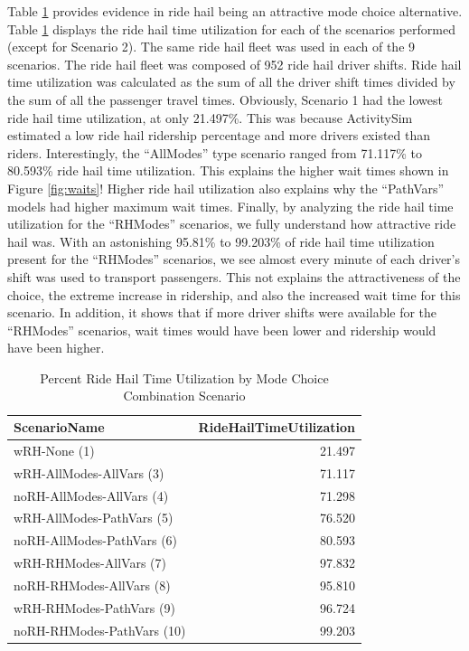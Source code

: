 \documentclass[12pt, oneside, openright]{byuthesis}
\begin{document}
Table \ref{tab:timeutil} provides evidence in ride hail being an attractive mode choice alternative. Table \ref{tab:timeutil} displays the ride hail time utilization for each of the scenarios performed (except for Scenario 2). The same ride hail fleet was used in each of the 9 scenarios. The ride hail fleet was composed of 952 ride hail driver shifts. Ride hail time utilization was calculated as the sum of all the driver shift times divided by the sum of all the passenger travel times. Obviously, Scenario 1 had the lowest ride hail time utilization, at only 21.497\%. This was because ActivitySim estimated a low ride hail ridership percentage and more drivers existed than riders. Interestingly, the ``AllModes'' type scenario ranged from 71.117\% to 80.593\% ride hail time utilization. This explains the higher wait times shown in Figure \ref{fig:waits}! Higher ride hail utilization also explains why the ``PathVars'' models had higher maximum wait times. Finally, by analyzing the ride hail time utilization for the ``RHModes'' scenarios, we fully understand how attractive ride hail was. With an astonishing 95.81\% to 99.203\% of ride hail time utilization present for the ``RHModes'' scenarios, we see almost every minute of each driver's shift was used to transport passengers. This not explains the attractiveness of the choice, the extreme increase in ridership, and also the increased wait time for this scenario. In addition, it shows that if more driver shifts were available for the ``RHModes'' scenarios, wait times would have been lower and ridership would have been higher.

\begin{table}

\caption{\label{tab:timeutil}Percent Ride Hail Time Utilization by Mode Choice Combination Scenario}
\centering
\begin{tabular}[t]{lr}
\toprule
ScenarioName & RideHailTimeUtilization\\
\midrule
wRH-None (1) & 21.497\\
wRH-AllModes-AllVars (3) & 71.117\\
noRH-AllModes-AllVars (4) & 71.298\\
wRH-AllModes-PathVars (5) & 76.520\\
noRH-AllModes-PathVars (6) & 80.593\\
\addlinespace
wRH-RHModes-AllVars (7) & 97.832\\
noRH-RHModes-AllVars (8) & 95.810\\
wRH-RHModes-PathVars (9) & 96.724\\
noRH-RHModes-PathVars (10) & 99.203\\
\bottomrule
\end{tabular}
\end{table}
\end{document}
